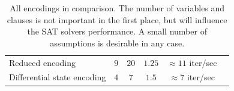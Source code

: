 \begin{table}
\begin{center}
\begin{tabular}{lccccc}
   Reduced encoding            & $9$          & $20$    & $1.25$        & $\approx11$ iter/sec \\
   Differential state encoding & $4$          & $7$     & $1.5$         & $\approx7$ iter/sec \\
  \end{tabular}
  \caption[All encodings in comparison]{
    All encodings in comparison.
    The number of variables and clauses is not important in the first place, but will influence the SAT solvers performance.
    A small number of assumptions is desirable in any case.
  }
  \label{tab:encoding-cmp}
 \end{center}
\end{table}

